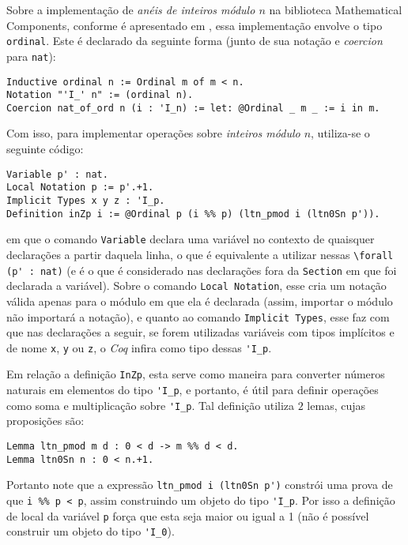 Sobre a implementação de \textit{anéis de inteiros módulo $n$} na biblioteca Mathematical Components, conforme é apresentado em \cite{assia_mahboubi_2022_7118596}, essa implementação envolve o tipo \lstinline[language = coq]{ordinal}. Este é declarado da seguinte forma (junto de sua notação e \textit{coercion} para \lstinline[language=coq]|nat|):
    \begin{lstlisting}[language=coq,frame=single,tabsize=1]
Inductive ordinal n := Ordinal m of m < n.
Notation "'I_' n" := (ordinal n).
Coercion nat_of_ord n (i : 'I_n) := let: @Ordinal _ m _ := i in m.
    \end{lstlisting}
Com isso, para implementar operações sobre \textit{inteiros módulo $n$}, utiliza-se o seguinte código:
    \begin{lstlisting}[language=coq,frame=single,tabsize=1]
Variable p' : nat.
Local Notation p := p'.+1.
Implicit Types x y z : 'I_p.
Definition inZp i := @Ordinal p (i %% p) (ltn_pmod i (ltn0Sn p')).
    \end{lstlisting}
em que o comando \lstinline[language = coq]{Variable} declara uma variável no contexto de quaisquer declarações a partir daquela linha, o que é equivalente a utilizar nessas \lstinline[language = coq]{\forall (p' : nat)} (e é o que é considerado nas declarações fora da \lstinline[language = coq]{Section} em que foi declarada a variável). Sobre o comando \lstinline[language = coq]{Local Notation}, esse cria um notação válida apenas para o módulo em que ela é declarada (assim, importar o módulo não importará a notação), e quanto ao comando \lstinline[language = coq]{Implicit Types}, esse faz com que nas declarações a seguir, se forem utilizadas variáveis com tipos implícitos e de nome \lstinline[language = coq]{x}, \lstinline[language = coq]{y} ou \lstinline[language = coq]{z}, o \textit{Coq} infira como tipo dessas \lstinline[language = coq]{'I_p}.

Em relação a definição \lstinline[language = coq]{InZp}, esta serve como maneira para converter números naturais em elementos do tipo \lstinline[language = coq]{'I_p}, e portanto, é útil para definir operações como soma e multiplicação sobre \lstinline[language = coq]{'I_p}. Tal definição utiliza $2$ lemas, cujas proposições são:
    \begin{lstlisting}[language=coq,frame=single,tabsize=1]
Lemma ltn_pmod m d : 0 < d -> m %% d < d.
Lemma ltn0Sn n : 0 < n.+1.
    \end{lstlisting}
Portanto note que a expressão \lstinline[language = coq]{ltn_pmod i (ltn0Sn p')} constrói uma prova de que \lstinline[language = coq]{i %% p < p}, assim construindo um objeto do tipo \lstinline[language = coq]{'I_p}. Por isso a definição de local da variável \lstinline[language = coq]{p} força que esta seja maior ou igual a 1 (não é possível construir um objeto do tipo \lstinline[language = coq]{'I_0}).

